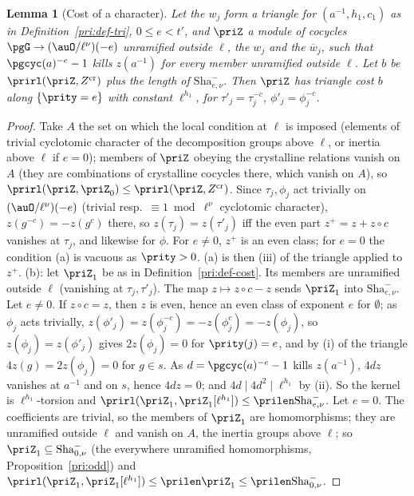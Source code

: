 \documentclass[10pt]{amsart}
\newtheorem{lemma}[theorem]{Lemma}
\theoremstyle{definition}
\theoremstyle{remark}
\begin{document}
\begin{lemma}[Cost of a character]\label{pri:cost}
Let the $w_j$ form a triangle for $(a^{-1},h_1,c_1)$ as in Definition~\ref{pri:def-tri}, $0\le e<t'$,
and $\priZ$ a module of cocycles $\pgG\to(\auO/\ell^\nu)(-e)$ unramified outside $\ell$, the $w_j$
and the $\overline w_j$, such that $\pgcyc(a)^{-e}-1$ kills $z(a^{-1})$ for every member unramified
outside $\ell$. Let $b$ be $\prirl(\priZ,Z^{\mathrm{cr}})$ plus the length of $\mathrm{Sha}^-_{e,\nu}$.
Then $\priZ$ has triangle cost $b$ along $\{\prity=e\}$ with constant $\ell^{h_1}$, for $\tau'_j=
\tau_j^{-c}$, $\phi'_j=\phi_j^{-c}$.
\end{lemma}
\begin{proof}
Take $A$ the set on which the local condition at $\ell$ is imposed (elements of trivial cyclotomic
character of the decomposition groups above $\ell$, or inertia above $\ell$ if $e=0$); members of
$\priZ$ obeying the crystalline relations vanish on $A$ (they are combinations of crystalline cocycles
there, which vanish on $A$), so
$\prirl(\priZ,\priZ_0)\le\prirl(\priZ,Z^{\mathrm{cr}})$. Since $\tau_j,\phi_j$ act trivially on
$(\auO/\ell^\nu)(-e)$ (trivial resp.\ $\equiv1\bmod\ell^\nu$ cyclotomic character), $z(g^{-c})=
-z(g^c)$ there, so $z(\tau_j)=z(\tau'_j)$ iff the even part $z^+=z+z\circ c$ vanishes at $\tau_j$,
and likewise for $\phi$. For $e\ne0$, $z^+$ is an even class;
for $e=0$ the condition (a) is vacuous as $\prity>0$. (a) is then (iii) of the triangle applied to
$z^+$. (b): let $\priZ_1$ be as in Definition~\ref{pri:def-cost}. Its members are unramified outside
$\ell$ (vanishing at $\tau_j,\tau'_j$). The map $z\mapsto z\circ c-z$ sends $\priZ_1$ into
$\mathrm{Sha}^-_{e,\nu}$. Let $e\ne0$. If $z\circ c=z$, then $z$ is even, hence an even class of
exponent $e$ for $\emptyset$; as $\phi_j$ acts trivially, $z(\phi'_j)=z(\phi_j^{-c})=-z(\phi_j^c)=
-z(\phi_j)$, so $z(\phi_j)=z(\phi'_j)$ gives $2z(\phi_j)=0$ for $\prity(j)=e$, and by (i) of the
triangle $4z(g)=2z(\phi_j)=0$ for $g\in s$. As $d=\pgcyc(a)^{-e}-1$ kills $z(a^{-1})$, $4dz$ vanishes
at $a^{-1}$ and on $s$, hence $4dz=0$; and $4d\mid4d^2\mid\ell^{h_1}$ by (ii). So the kernel is
$\ell^{h_1}$-torsion and $\prirl(\priZ_1,\priZ_1[\ell^{h_1}])\le\prilen\mathrm{Sha}^-_{e,\nu}$. Let
$e=0$. The coefficients are trivial, so the members of $\priZ_1$ are homomorphisms; they are
unramified outside $\ell$ and vanish on $A$, the inertia groups above $\ell$; so
$\priZ_1\subseteq\mathrm{Sha}^-_{0,\nu}$ (the everywhere unramified homomorphisms,
Proposition~\ref{pri:odd}) and $\prirl(\priZ_1,\priZ_1[\ell^{h_1}])\le\prilen\priZ_1\le\prilen
\mathrm{Sha}^-_{0,\nu}$.
\end{proof}
\end{document}
